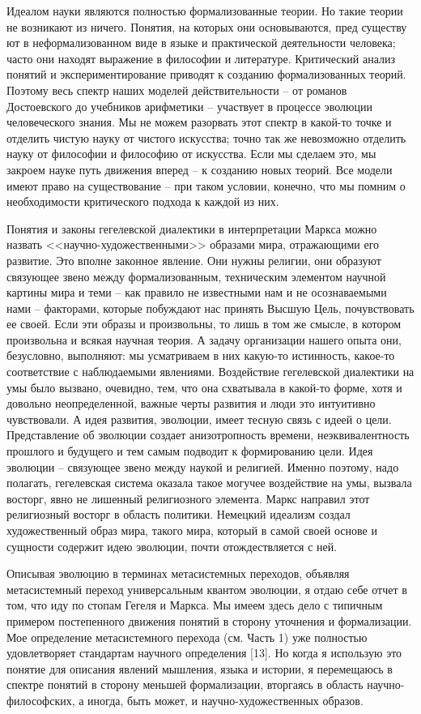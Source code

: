 \documentclass{book}
\begin{document}
Идеалом науки являются полностью формализованные теории. Но такие теории не возникают из ничего. Понятия, на которых они основываются, пред существу ют в неформализованном виде в языке и практической деятельности человека; часто они находят выражение в философии и литературе. Критический анализ понятий и экспериментирование приводят к со­зданию формализованных теорий. Поэтому весь спектр наших моделей действительности -- от романов Достоевского до учебников арифметики -- участвует в процессе эволюции человече­ского знания. Мы не можем разорвать этот спектр в какой-то точке и отделить чистую науку от чистого искусства; точно так же невозможно отделить науку от философии и философию от искусства. Если мы сделаем это, мы закроем науке путь движения вперед -- к созданию новых теорий. Все модели имеют право на существование -- при таком условии, конечно, что мы помним о необходимости критического подхода к каждой из них.

Понятия и законы гегелевской диалектики в интерпретации Маркса можно назвать <<научно-художественными>> образами мира, отражающими его развитие. Это вполне законное явле­ние. Они нужны религии, они образуют связующее звено между формализованным, техническим элементом научной картины мира и теми -- как правило не известными нам и не осознавае­мыми нами -- факторами, которые побуждают нас принять Выс­шую Цель, почувствовать ее своей. Если эти образы и произ­вольны, то лишь в том же смысле, в котором произвольна и всякая научная теория. А задачу организации нашего опыта они, безусловно, выполняют: мы усматриваем в них какую-то истинность, какое-то соответствие с наблюдаемыми явлениями. Воздействие гегелевской диалектики на умы было вызвано, очевидно, тем, что она схватывала в какой-то форме, хотя и до­вольно неопределенной, важные черты развития и люди это интуитивно чувствовали. А идея развития, эволюции, имеет тес­ную связь с идеей о цели. Представление об эволюции создает анизотропность времени, 
неэквивалентность прошлого и будущего и тем самым подводит к формированию цели. Идея эволюции -- связующее звено между наукой и религией. Именно поэтому, надо полагать, гегелевская система оказала такое могучее воздействие на умы, вызвала восторг, явно не лишенный религиозного элемента. Маркс направил этот религиозный восторг в область политики. Немецкий идеализм создал художественный образ мира, такого мира, который в самой своей основе и сущности содержит идею эволюции, почти отождествляется с ней.

Описывая эволюцию в терминах метасистемных переходов, объявляя метасистемный переход универсальным квантом эволюции, я отдаю себе отчет в том, что иду по стопам Гегеля и Маркса. Мы имеем здесь дело с типичным примером постепен­ного движения понятий в сторону уточнения и формализации. Мое определение метасистемного перехода (см. Часть 1) уже полностью удовлетворяет стандартам научного определения [13]. Но когда я использую это понятие для описания явлений мыш­ления, языка и истории, я перемещаюсь в спектре понятий в сторону меньшей формализации, вторгаясь в область научно-философских, а иногда, быть может, и научно-художественных образов.
\end{document}
